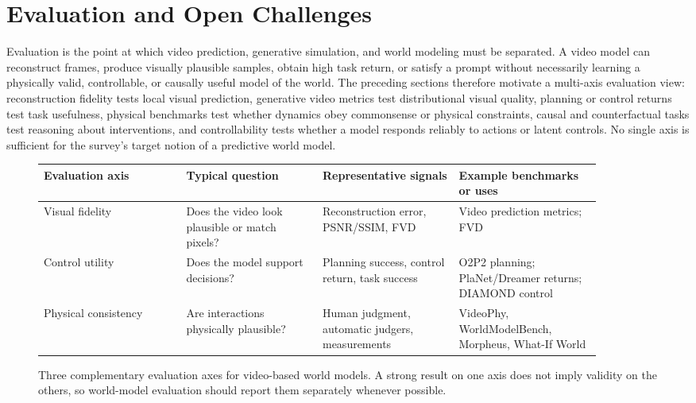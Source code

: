 \section{Evaluation and Open Challenges}
\label{sec:evaluation_open_challenges}

Evaluation is the point at which video prediction, generative simulation, and world modeling must be separated. A video model can reconstruct frames, produce visually plausible samples, obtain high task return, or satisfy a prompt without necessarily learning a physically valid, controllable, or causally useful model of the world. The preceding sections therefore motivate a multi-axis evaluation view: reconstruction fidelity tests local visual prediction, generative video metrics test distributional visual quality, planning or control returns test task usefulness, physical benchmarks test whether dynamics obey commonsense or physical constraints, causal and counterfactual tasks test reasoning about interventions, and controllability tests whether a model responds reliably to actions or latent controls. No single axis is sufficient for the survey's target notion of a predictive world model.

\begin{figure}[t]
\centering
\small
\begin{tabular}{p{0.23\linewidth} p{0.22\linewidth} p{0.22\linewidth} p{0.23\linewidth}}
\toprule
Evaluation axis & Typical question & Representative signals & Example benchmarks or uses \\
\midrule
Visual fidelity & Does the video look plausible or match pixels? & Reconstruction error, PSNR/SSIM, FVD & Video prediction metrics; FVD \cite{unterthiner2018_fvd_prov} \\
Control utility & Does the model support decisions? & Planning success, control return, task success & O2P2 planning; PlaNet/Dreamer returns; DIAMOND control \cite{janner2019_o2p2_prov,hafner2019_planet_prov,hafner2020_dreamer_prov,alonso2024_diamond_prov} \\
Physical consistency & Are interactions physically plausible? & Human judgment, automatic judgers, measurements & VideoPhy, WorldModelBench, Morpheus, What-If World \cite{bansal2025_videophy_prov,li2025worldmodelbench_prov,zhang2025morpheus_prov,cai2026whatifworld_prov} \\
\bottomrule
\end{tabular}
\caption{Three complementary evaluation axes for video-based world models. A strong result on one axis does not imply validity on the others, so world-model evaluation should report them separately whenever possible.}
\label{fig:evaluation_axes}
\end{figure}

